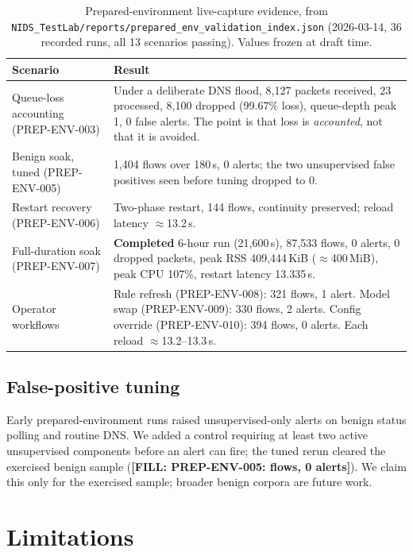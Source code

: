 \documentclass[11pt]{article}
\newcommand{\code}[1]{\texttt{#1}}
\newcommand{\FILL}[1]{\textbf{[FILL: #1]}}
\begin{document}
\begin{table}[h]
\centering
\begin{tabular}{lp{8.8cm}}
\toprule
Scenario & Result \\
\midrule
Queue-loss accounting (PREP-ENV-003) & Under a deliberate DNS flood, 8{,}127 packets received, 23 processed, 8{,}100 dropped (99.67\% loss), queue-depth peak 1, 0 false alerts. The point is that loss is \emph{accounted}, not that it is avoided. \\
Benign soak, tuned (PREP-ENV-005) & 1{,}404 flows over 180\,s, 0 alerts; the two unsupervised false positives seen before tuning dropped to 0. \\
Restart recovery (PREP-ENV-006) & Two-phase restart, 144 flows, continuity preserved; reload latency $\approx$13.2\,s. \\
Full-duration soak (PREP-ENV-007) & \textbf{Completed} 6-hour run (21{,}600\,s), 87{,}533 flows, 0 alerts, 0 dropped packets, peak RSS 409{,}444\,KiB ($\approx$400\,MiB), peak CPU 107\%, restart latency 13.335\,s. \\
Operator workflows & Rule refresh (PREP-ENV-008): 321 flows, 1 alert. Model swap (PREP-ENV-009): 330 flows, 2 alerts. Config override (PREP-ENV-010): 394 flows, 0 alerts. Each reload $\approx$13.2--13.3\,s. \\
\bottomrule
\end{tabular}
\caption{Prepared-environment live-capture evidence, from
\code{NIDS\_TestLab/reports/prepared\_env\_validation\_index.json}
(2026-03-14, 36 recorded runs, all 13 scenarios passing). Values frozen at draft
time.}
\label{tab:prepenv}
\end{table}

\subsection{False-positive tuning}

Early prepared-environment runs raised unsupervised-only alerts on benign status
polling and routine DNS. We added a control requiring at least two active
unsupervised components before an alert can fire; the tuned rerun cleared the
exercised benign sample (\FILL{PREP-ENV-005: flows, 0 alerts}). We claim this only
for the exercised sample; broader benign corpora are future work.

\section{Limitations}
\label{sec:limits}
\end{document}
